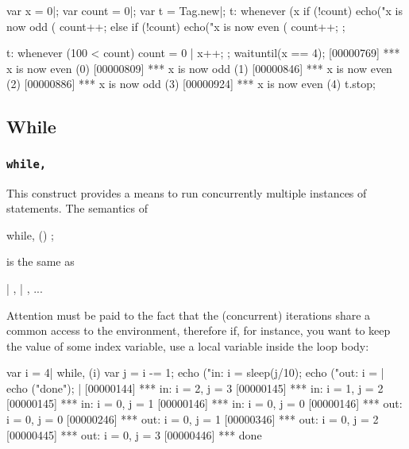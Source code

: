 \begin{urbiscript}[firstnumber=1]
var x = 0|;
var count = 0|;
var t = Tag.new|;
t:
  whenever (x %
  {
    if (!count)
      echo("x is now odd (%
    count++;
  }
  else
  {
    if (!count)
      echo("x is now even (%
    count++;
  };

t:
  whenever (100 < count)
  {
    count = 0 |
    x++;
  };
waituntil(x == 4);
[00000769] *** x is now even (0)
[00000809] *** x is now odd (1)
[00000846] *** x is now even (2)
[00000886] *** x is now odd (3)
[00000924] *** x is now even (4)
t.stop;
\end{urbiscript}


\subsection{While}
\subsubsection{\lstinline|while,|}
\label{sec:lang:while:comma}
\experimentalremoved{}

This construct provides a means to run concurrently multiple instances
of statements.  The semantics of

\begin{urbiunchecked}
while, ()
  ;
\end{urbiunchecked}

\noindent
is the same as

\begin{urbiunchecked}
 |  ,  |  , ...
\end{urbiunchecked}

Attention must be paid to the fact that the (concurrent) iterations
share a common access to the environment, therefore if, for instance,
you want to keep the value of some index variable, use a local
variable inside the loop body:

\begin{urbiscript}[firstnumber=1]
{
  var i = 4|
  while, (i)
  {
    var j = i -= 1;
    echo ("in: i = %
    sleep(j/10);
    echo ("out: i = %
  }|
  echo ("done");
}|
[00000144] *** in: i = 2, j = 3
[00000145] *** in: i = 1, j = 2
[00000145] *** in: i = 0, j = 1
[00000146] *** in: i = 0, j = 0
[00000146] *** out: i = 0, j = 0
[00000246] *** out: i = 0, j = 1
[00000346] *** out: i = 0, j = 2
[00000445] *** out: i = 0, j = 3
[00000446] *** done
\end{urbiscript}

